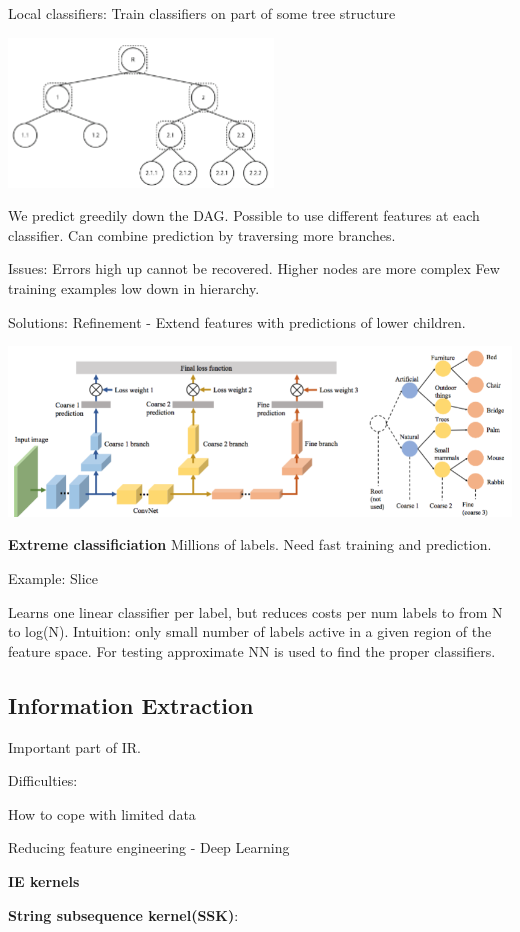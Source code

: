 \documentclass[a4paper,10pt,landscape]{article}
\newenvironment{Figure}
  {\par\medskip\noindent\minipage{\linewidth}}
  {\endminipage\par\medskip}
\newcommand{\topic}[1]{\begin{center}\section*{#1}\end{center}}
\begin{document}
\begin{multicols}{3}
Local classifiers: Train classifiers on part of some tree structure
\begin{Figure}
\includegraphics[width=.5\linewidth]{images/hierarchy.png}
\end{Figure}
We predict greedily down the DAG. Possible to use different features at each classifier. Can combine prediction by traversing more branches.
 
 Issues:
 Errors high up cannot be recovered.
 Higher nodes are more complex
 Few training examples low down in hierarchy.
 
 Solutions:
 Refinement - Extend features with predictions of lower children.

\includegraphics[width=.5\linewidth]{images/CNN_hierarchy}

\textbf{Extreme classificiation}
Millions of labels. Need fast training and prediction.

 Example: Slice
 
 Learns one linear classifier per label, but reduces costs per num labels to from N to log(N). Intuition: only small number of labels active in a given region of the feature space. For testing approximate NN is used to find the proper classifiers.
 
 \topic{Information Extraction}
 Important part of IR.
 
 Difficulties:
 
 How to cope with limited data
 
 Reducing feature engineering - Deep Learning
 
 \textbf{IE kernels}
 
 \textbf{String subsequence kernel(SSK)}:
 

\end{multicols}
\end{document}

